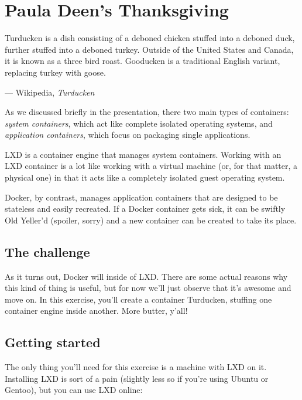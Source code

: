 \chapter*{Paula Deen's Thanksgiving}

\begin{quoting}
  Turducken is a dish consisting of a deboned chicken stuffed into a deboned duck, further stuffed into a deboned turkey. Outside of the United States and Canada, it is known as a three bird roast. Gooducken is a traditional English variant, replacing turkey with goose.

  \begin{flushright}
    --- Wikipedia, \textit{Turducken}
  \end{flushright}
\end{quoting}

\vspace{2em}

As we discussed briefly in the presentation, there two main types of containers: \textit{system containers}, which act like complete isolated operating systems, and \textit{application containers}, which focus on packaging single applications.

LXD is a container engine that manages system containers. Working with an LXD container is a lot like working with a virtual machine (or, for that matter, a physical one) in that it acts like a completely isolated guest operating system.

Docker, by contrast, manages application containers that are designed to be stateless and easily recreated. If a Docker container gets sick, it can be swiftly Old Yeller'd (spoiler, sorry) and a new container can be created to take its place.

\section*{The challenge}

As it turns out, Docker will inside of LXD. There are some actual reasons why this kind of thing is useful, but for now we'll just observe that it's awesome and move on. In this exercise, you'll create a container Turducken, stuffing one container engine inside another. More butter, y'all!

\section*{Getting started}

The only thing you'll need for this exercise is a machine with LXD on it. Installing LXD is sort of a pain (slightly less so if you're using Ubuntu or Gentoo), but you can use LXD online:

